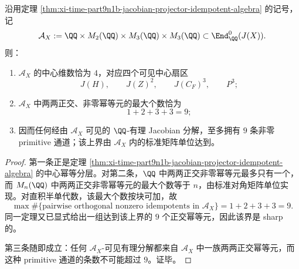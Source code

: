 \begin{theorem}\label{thm:derived-hurwitz-visible-rational-projection-algebra-nine-channels}
沿用定理 \ref{thm:xi-time-part9n1b-jacobian-projector-idempotent-algebra} 的记号，记
\[
\mathcal A_X:=\QQ\times M_2(\QQ)\times M_3(\QQ)\times M_3(\QQ)
\subset \End^0_{\QQ}(J(X)).
\]
则：
\begin{enumerate}
  \item \(\mathcal A_X\) 的中心维数恰为 \(4\)，对应四个可见中心扇区
  \[
  J(H),\qquad J(Z)^2,\qquad J(C_F)^3,\qquad P^3;
  \]
  \item \(\mathcal A_X\) 中两两正交、非零幂等元的最大个数恰为
  \[
  1+2+3+3=9;
  \]
  \item 因而任何经由 \(\mathcal A_X\) 可见的 \(\QQ\)-有理 Jacobian 分解，至多拥有 \(9\) 条非零 primitive 通道；该上界由 \(\mathcal A_X\) 内的标准矩阵单位达到。
\end{enumerate}
\end{theorem}
\begin{proof}
第一条正是定理 \ref{thm:xi-time-part9n1b-jacobian-projector-idempotent-algebra} 的中心幂等分层。对第二条，\(\QQ\) 中两两正交非零幂等元最多只有一个，而 \(M_n(\QQ)\) 中两两正交非零幂等元的最大个数等于 \(n\)，由标准对角矩阵单位实现。对直积半单代数，该最大个数按块可加，故
\[
\max\#\{\text{pairwise orthogonal nonzero idempotents in }\mathcal A_X\}=1+2+3+3=9.
\]
同一定理又已显式给出一组达到该上界的 \(9\) 个正交幂等元，因此该界是 sharp 的。

第三条随即成立：任何 \(\mathcal A_X\)-可见有理分解都来自 \(\mathcal A_X\) 中一族两两正交幂等元，而这种 primitive 通道的条数不可能超过 \(9\)。证毕。
\end{proof}

